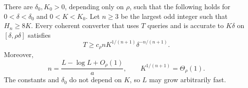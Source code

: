 \begin{theorem}\label{thm:joint-exterior}
There are $\delta_0,K_0>0$, depending only on $\rho$, such that the following holds for $0<\delta<\delta_0$ and $0<K<K_0$. Let $n\geq3$ be the largest odd integer such that $H_n\geq8K$. Every coherent converter that uses $T$ queries and is accurate to $K\delta$ on $[\delta,\rho\delta]$ satisfies
\begin{equation}\label{eq:exterior-query}
 T\geq c_\rho nK^{1/(n+1)}\delta^{-n/(n+1)}.
\end{equation}
Moreover,
\begin{equation}\label{eq:nK}
 n=\frac{L-\log L+O_\rho(1)}a,
 \qquad K^{1/(n+1)}=\Theta_\rho(1).
\end{equation}
The constants and $\delta_0$ do not depend on $K$, so $L$ may grow arbitrarily fast.
\end{theorem}
